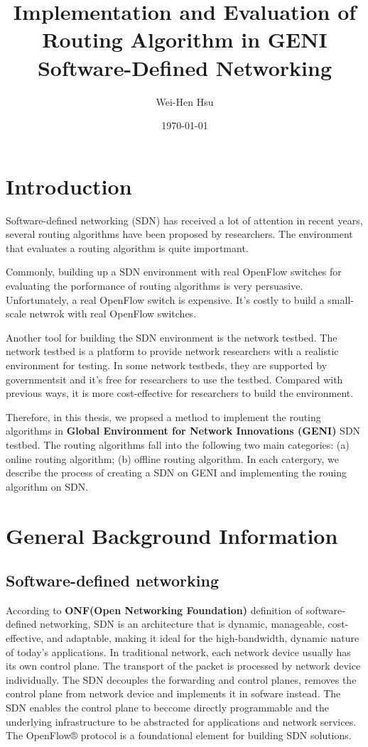 \documentclass[a4paper,12pt]{report}
\title{Implementation and Evaluation of Routing Algorithm in GENI Software-Defined Networking}
\author{Wei-Hen Hsu}
\date{\today}
\begin{document}
  \begin{large}
  \maketitle{}
  \tableofcontents{}
  \chapter{Introduction}
	    \qquad Software-defined networking (SDN) has received a lot of attention in recent years, 
	            several routing algorithms have been proposed by researchers. The environment that evaluates a 
	            routing algorithm is quite importmant.\par
	    \qquad Commonly, building up a SDN environment with real OpenFlow switches for evaluating the porformance
	            of routing algorithms is very persuasive. Unfortunately, a real OpenFlow switch is expensive. It's 
	            costly to build a small-scale netwrok with real OpenFlow switches.\par
	    \qquad Another tool for building the SDN environment is the network testbed. The network testbed is a 
	            platform to provide network researchers with a realistic environment for testing. In some network testbeds, they are supported by governmentsit and it's free for researchers to use the testbed. Compared with previous ways, it is more cost-effective for researchers to build the environment.\par
	    \qquad Therefore, in this thesis, we propsed a method to implement the routing algorithms in {\bf Global 
	            Environment for Network Innovations (GENI)} SDN testbed. The routing algorithms fall into the following two main categories: (a) online routing algorithm; (b) offline routing algorithm. In each catergory, we describe the process of creating a SDN on GENI and implementing the rouing algorithm on SDN. 
  \chapter{General Background Information}
    \section{Software-defined networking}
      \qquad According to {\bf ONF(Open Networking Foundation)} definition of software-defined networking, SDN is 
                an architecture that is dynamic, manageable, cost-effective, and adaptable, making it ideal for the 
                high-bandwidth, dynamic nature of today’s applications. In traditional network, each network device 
                usually has its own control plane. The transport of the packet is processed by network device 
                individually. The SDN decouples the forwarding and control planes, removes the control plane from 
                network device and implements it in sofware instead. The SDN enables the control plane to beccome 
                directly programmable and the underlying infrastructure to be abstracted for applications and network 
                services. The OpenFlow® protocol is a foundational element for building SDN solutions.

\end{large}
\end{document}
